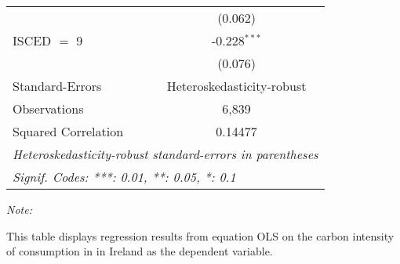 \begin{table}[htbp!]
\begin{adjustbox}{width = 1\textwidth, max height = 0.95\textheight, center}
\begin{threeparttable}[b]
\begin{tabular}{lc}
                                & (0.062)\\   
            ISCED $=$ 9         & -0.228$^{***}$\\   
                                & (0.076)\\   
            \midrule 
            Standard-Errors     & Heteroskedasticity-robust \\   
            Observations        & 6,839\\  
            Squared Correlation & 0.14477\\  
            \midrule \midrule
            \multicolumn{2}{l}{\emph{Heteroskedasticity-robust standard-errors in parentheses}}\\
            \multicolumn{2}{l}{\emph{Signif. Codes: ***: 0.01, **: 0.05, *: 0.1}}\\
         \end{tabular}
         
         \begin{tablenotes}\item \medskip \textit{Note:}
            \item This table displays regression results from equation OLS on the carbon intensity of consumption in  in Ireland as the dependent variable. 
         \end{tablenotes}
      \end{threeparttable}
   \end{adjustbox}
\end{table}


